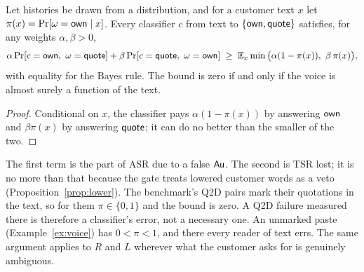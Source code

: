 \begin{proposition}\label{prop:bayes}
Let histories be drawn from a distribution, and for a customer text $x$ let
$\pi(x) = \Pr[\omega = \mathsf{own} \mid x]$. Every classifier $c$ from text to $\{\mathsf{own}, \mathsf{quote}\}$
satisfies, for any weights $\alpha, \beta > 0$,
\[
\alpha \Pr[c = \mathsf{own},\ \omega = \mathsf{quote}] + \beta \Pr[c = \mathsf{quote},\ \omega = \mathsf{own}]
\;\geq\; \mathbb{E}_x \min\big(\alpha (1 - \pi(x)),\ \beta\, \pi(x)\big),
\]
with equality for the Bayes rule. The bound is zero if and only if the voice is almost surely a
function of the text.
\end{proposition}
\begin{proof}
Conditional on $x$, the classifier pays $\alpha(1 - \pi(x))$ by answering $\mathsf{own}$ and
$\beta\pi(x)$ by answering $\mathsf{quote}$; it can do no better than the smaller of the two.
\end{proof}

\begin{remark}
The first term is the part of ASR due to a false $\mathsf{Au}$. The second is TSR lost; it is no more
than that because the gate treats lowered customer words as a veto
(Proposition~\ref{prop:lower}). The benchmark's Q2D
pairs mark their quotations in the text, so for them $\pi \in \{0, 1\}$ and the bound is zero. A
Q2D failure measured there is therefore a classifier's error, not a necessary one. An unmarked
paste (Example~\ref{ex:voice}) has $0 < \pi < 1$, and there every reader of text errs. The same
argument applies to $R$ and $L$ wherever what the customer asks for is genuinely ambiguous.
\end{remark}
